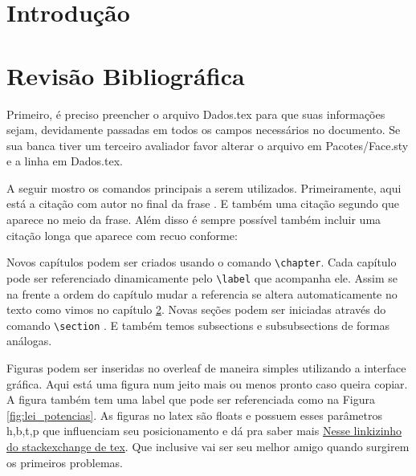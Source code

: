 
\chapter{Introdução} \label{intro}

\lipsum[2]


\chapter{Revisão Bibliográfica} \label{revisao}

Primeiro, é preciso preencher o arquivo Dados.tex para que suas informações sejam, devidamente passadas em todos os campos necessários no documento. Se sua banca tiver um terceiro avaliador favor alterar o arquivo em Pacotes/Face.sty e a linha em Dados.tex.

A seguir mostro os comandos principais a serem utilizados. Primeiramente, aqui está a citação com autor no final da frase \cite{nome_facil}. E também uma citação segundo \textcite{nome_facil} que aparece no meio da frase. Além disso é sempre possível também incluir uma citação longa que aparece com recuo conforme:

\begin{quote}
    \lipsum[3]\cite{nome_facil}
\end{quote}

Novos capítulos podem ser criados usando o comando \verb!\chapter!. Cada capítulo pode ser referenciado dinamicamente pelo \verb!\label! que acompanha ele. Assim se na frente a ordem do capítulo mudar a referencia se altera automaticamente no texto como vimos no capítulo \ref{revisao}. Novas seções podem ser iniciadas através do comando \verb!\section! . E também temos subsections e subsubsections de formas análogas.

Figuras podem ser inseridas no overleaf de maneira simples utilizando a interface gráfica. Aqui está uma figura num jeito mais ou menos pronto caso queira copiar. A figura também tem uma label que pode ser referenciada como na Figura \ref{fig:lei_potencias}. As figuras no latex são floats e possuem esses parâmetros h,b,t,p que influenciam seu posicionamento e dá pra saber mais \href{https://tex.stackexchange.com/questions/39017/how-to-influence-the-position-of-float-environments-like-figure-and-table-in-lat}{Nesse linkizinho do stackexchange de tex}. Que inclusive vai ser seu melhor amigo quando surgirem os primeiros problemas. 

